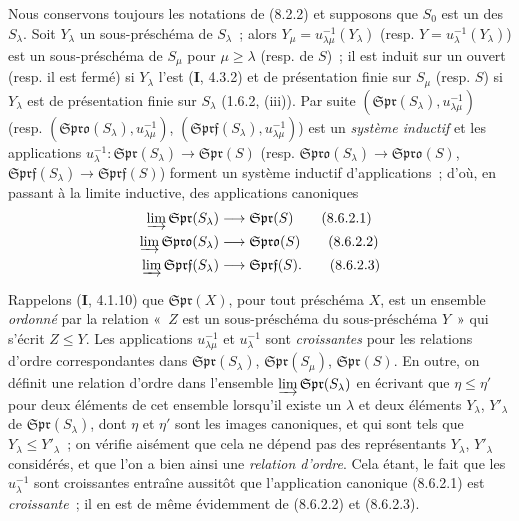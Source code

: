 \begin{env}[8.6.2]
\label{IV.8.6.2-fr}
Nous conservons toujours les notations de (8.2.2) et supposons que $S_0$ est
un des $S_\lambda$. Soit $Y_\lambda$ un sous-préschéma de $S_\lambda$~; alors
$Y_\mu=u_{\lambda\mu}^{-1}(Y_\lambda)$ (resp.
$Y=u_\lambda^{-1}(Y_\lambda)$) est un sous-préschéma de $S_\mu$ pour
$\mu\geq\lambda$ (resp. de $S$)~; il est induit sur un ouvert (resp. il est
fermé) si $Y_\lambda$ l'est (\textbf{I}, 4.3.2) et de présentation finie sur $S_\mu$
(resp. $S$) si $Y_\lambda$ est de présentation finie sur $S_\lambda$
(1.6.2, (iii)). Par suite
$(\mathfrak{Spr}(S_\lambda),u_{\lambda\mu}^{-1})$ (resp.
$(\mathfrak{Spro}(S_\lambda),u_{\lambda\mu}^{-1})$,
$(\mathfrak{Sprf}(S_\lambda),u_{\lambda\mu}^{-1})$) est un \emph{système inductif} et
les applications
$u_\lambda^{-1}:\mathfrak{Spr}(S_\lambda)\to\mathfrak{Spr}(S)$ (resp.
$\mathfrak{Spro}(S_\lambda)\to\mathfrak{Spro}(S)$,
$\mathfrak{Sprf}(S_\lambda)\to\mathfrak{Sprf}(S)$) forment un système inductif
d'applications~; d'où, en passant à la limite inductive, des applications
canoniques
\begin{align}
  \varinjlim\mathfrak{Spr}(S_\lambda)
    &\longrightarrow\mathfrak{Spr}(S)
    \tag{8.6.2.1}\label{IV.8.6.2.1-fr}\\
  \varinjlim\mathfrak{Spro}(S_\lambda)
    &\longrightarrow\mathfrak{Spro}(S)
    \tag{8.6.2.2}\label{IV.8.6.2.2-fr}\\
  \varinjlim\mathfrak{Sprf}(S_\lambda)
    &\longrightarrow\mathfrak{Sprf}(S).
    \tag{8.6.2.3}\label{IV.8.6.2.3-fr}
\end{align}
\end{env}


Rappelons (\textbf{I}, 4.1.10) que $\mathfrak{Spr}(X)$, pour tout préschéma $X$, est un
ensemble \emph{ordonné} par la relation «~$Z$ est un sous-préschéma du
sous-préschéma $Y$~» qui s'écrit $Z\leq Y$. Les applications
$u_{\lambda\mu}^{-1}$ et $u_\lambda^{-1}$ sont \emph{croissantes} pour les
relations d'ordre correspondantes dans $\mathfrak{Spr}(S_\lambda)$,
$\mathfrak{Spr}(S_\mu)$, $\mathfrak{Spr}(S)$. En outre, on définit une relation
d'ordre dans l'ensemble $\varinjlim\mathfrak{Spr}(S_\lambda)$ en écrivant que
$\eta\leq\eta'$ pour deux éléments de cet ensemble lorsqu'il existe un
$\lambda$ et deux éléments $Y_\lambda$, $Y'_\lambda$ de
$\mathfrak{Spr}(S_\lambda)$, dont $\eta$ et $\eta'$ sont les images canoniques,
et qui sont tels que $Y_\lambda\leq Y'_\lambda$~; on vérifie aisément que cela
ne dépend pas des représentants $Y_\lambda$, $Y'_\lambda$ considérés, et que
l'on a bien ainsi une \emph{relation d'ordre}. Cela étant, le fait que les
$u_\lambda^{-1}$ sont croissantes entraîne aussitôt que l'application
canonique (8.6.2.1) est \emph{croissante}~; il en est de même évidemment de
(8.6.2.2) et (8.6.2.3).

